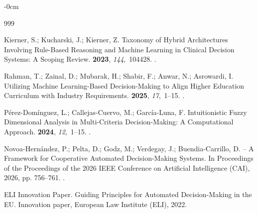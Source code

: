 \documentclass[mathematics,article,submit,moreauthors]{Definitions/mdpi}
\begin{document}
\begin{adjustwidth}{-\extralength}{0cm}

\begin{thebibliography}{999}
    
    Kierner, S.; Kucharski, J.; Kierner, Z.
    \newblock Taxonomy of Hybrid Architectures Involving Rule-Based Reasoning and
    Machine Learning in Clinical Decision Systems: A Scoping Review.
     {\bf 2023}, {\em
        144},~104428.
    .
    
    Rahman, T.; Zainal, D.; Mubarak, H.; Shabir, F.; Anwar, N.; Asrowardi, I.
    \newblock Utilizing Machine Learning-Based Decision-Making to Align Higher
    Education Curriculum with Industry Requirements.
    {\bf 2025}, {\em 17},~1--15.
    .
    
    Pérez-Domínguez, L.; Callejas-Cuervo, M.; García-Luna, F.
    \newblock Intuitionistic Fuzzy Dimensional Analysis in Multi-Criteria
    Decision-Making: A Computational Approach.
     {\bf 2024}, {\em 12},~1--15.
    .
    
    Novoa-Hernández, P.; Pelta, D.; Godz, M.; Verdegay, J.; Buendia-Carrillo, D.
     – A Framework for Cooperative Automated Decision-Making
    Systems.
    \newblock In Proceedings of the Proceedings of the 2026 IEEE Conference on
    Artificial Intelligence (CAI),  2026, pp. 756--761.
    .
    
    {ELI Innovation Paper}.
    \newblock Guiding Principles for Automated Decision-Making in the {EU}.
    \newblock Innovation paper, European Law Institute (ELI),  2022.
    

\end{thebibliography}
\end{adjustwidth}
\end{document}
